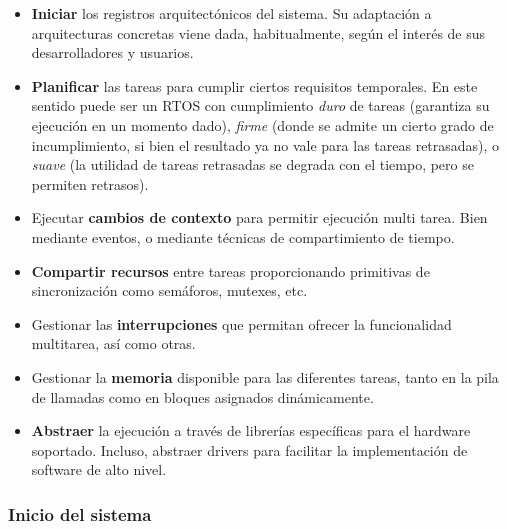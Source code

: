 \documentclass[../main.tex]{subfiles}
\begin{document}
        \begin{itemize}
            \item \textbf{Iniciar} los registros arquitectónicos del sistema. Su adaptación a arquitecturas concretas viene dada, habitualmente, según el interés de sus desarrolladores y usuarios.
            \item \textbf{Planificar} las tareas para cumplir ciertos requisitos temporales. En este sentido puede ser un RTOS con cumplimiento \emph{duro} de tareas (garantiza su ejecución en un momento dado), \emph{firme} (donde se admite un cierto grado de incumplimiento, si bien el resultado ya no vale para las tareas retrasadas), o \emph{suave} (la utilidad de tareas retrasadas se degrada con el tiempo, pero se permiten retrasos).
            \item Ejecutar \textbf{cambios de contexto} para permitir ejecución multi tarea. Bien mediante eventos, o mediante técnicas de compartimiento de tiempo.
            \item \textbf{Compartir recursos} entre tareas proporcionando primitivas de sincronización como semáforos, mutexes, etc.
            \item Gestionar las \textbf{interrupciones} que permitan ofrecer la funcionalidad multitarea, así como otras.
            \item Gestionar la \textbf{memoria} disponible para las diferentes tareas, tanto en la pila de llamadas como en bloques asignados dinámicamente.
            \item \textbf{Abstraer} la ejecución a través de librerías específicas para el hardware soportado. Incluso, abstraer drivers para facilitar la implementación de software de alto nivel.
        \end{itemize}

        \subsubsection{Inicio del sistema}
            
\end{document}
